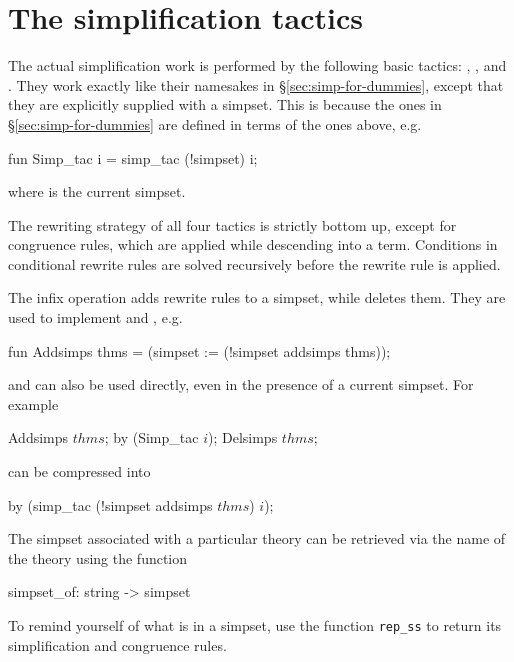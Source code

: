 \section{The simplification tactics}
\label{simp-tactics}

The actual simplification work is performed by the following basic tactics:
, ,
 and .  They work
exactly like their namesakes in \S\ref{sec:simp-for-dummies}, except that
they are explicitly supplied with a simpset.  This is because the ones in
\S\ref{sec:simp-for-dummies} are defined in terms of the ones above, e.g.
\begin{ttbox}
fun Simp_tac i = simp_tac (!simpset) i;
\end{ttbox}
where  is the current simpset.

The rewriting strategy of all four tactics is strictly bottom up, except for
congruence rules, which are applied while descending into a term.  Conditions
in conditional rewrite rules are solved recursively before the rewrite rule
is applied.

The infix operation  adds rewrite rules to a
simpset, while  deletes them.  They are used to
implement  and , e.g.
\begin{ttbox}
fun Addsimps thms = (simpset := (!simpset addsimps thms));
\end{ttbox}
and can also be used directly, even in the presence of a current simpset.  For
example
\begin{ttbox}
Addsimps \(thms\);
by (Simp_tac \(i\));
Delsimps \(thms\);
\end{ttbox}
can be compressed into
\begin{ttbox}
by (simp_tac (!simpset addsimps \(thms\)) \(i\));
\end{ttbox}

The simpset associated with a particular theory can be retrieved via the name
of the theory using the function
\begin{ttbox}
simpset_of: string -> simpset
\end{ttbox}

To remind yourself of what is in a simpset, use the function \verb$rep_ss$ to
return its simplification and congruence rules.

